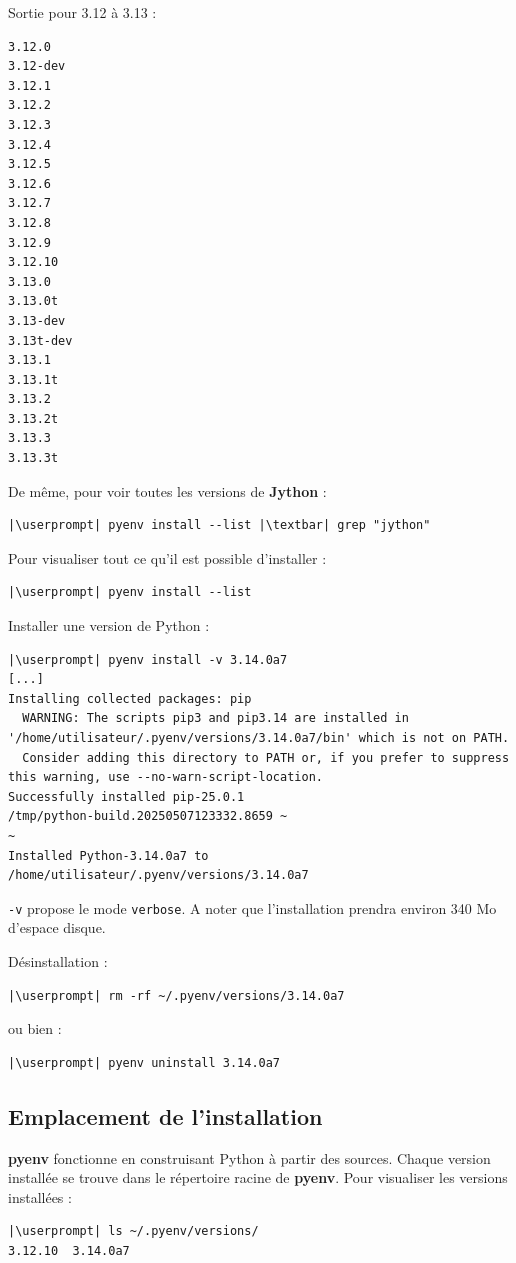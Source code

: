 Sortie pour 3.12 à 3.13 :
\begin{lstlisting}[style=visual]
3.12.0
3.12-dev
3.12.1
3.12.2
3.12.3
3.12.4
3.12.5
3.12.6
3.12.7
3.12.8
3.12.9
3.12.10
3.13.0
3.13.0t
3.13-dev
3.13t-dev
3.13.1
3.13.1t
3.13.2
3.13.2t
3.13.3
3.13.3t
\end{lstlisting}

De même, pour voir toutes les versions de \textbf{Jython} :
\begin{lstlisting}[style=bash]
|\userprompt| pyenv install --list |\textbar| grep "jython"
\end{lstlisting}

Pour visualiser tout ce qu'il est possible d'installer :
\begin{lstlisting}[style=bash]
|\userprompt| pyenv install --list
\end{lstlisting}

Installer une version de Python :
\begin{lstlisting}[style=bash]
|\userprompt| pyenv install -v 3.14.0a7
[...]
Installing collected packages: pip
  WARNING: The scripts pip3 and pip3.14 are installed in '/home/utilisateur/.pyenv/versions/3.14.0a7/bin' which is not on PATH.
  Consider adding this directory to PATH or, if you prefer to suppress this warning, use --no-warn-script-location.
Successfully installed pip-25.0.1
/tmp/python-build.20250507123332.8659 ~
~
Installed Python-3.14.0a7 to /home/utilisateur/.pyenv/versions/3.14.0a7
\end{lstlisting}

\texttt{-v} propose le mode \texttt{verbose}. A noter que l'installation prendra environ 340 Mo d'espace disque.

Désinstallation :
\begin{lstlisting}[style=bash]
|\userprompt| rm -rf ~/.pyenv/versions/3.14.0a7
\end{lstlisting}

ou bien :
\begin{lstlisting}[style=bash]
|\userprompt| pyenv uninstall 3.14.0a7
\end{lstlisting}

\subsection*{Emplacement de l'installation}
\textbf{pyenv} fonctionne en construisant Python à partir des sources. Chaque version installée se trouve dans le répertoire racine de \textbf{pyenv}. Pour visualiser les versions installées :
\begin{lstlisting}[style=bash]
|\userprompt| ls ~/.pyenv/versions/
3.12.10  3.14.0a7
\end{lstlisting}

